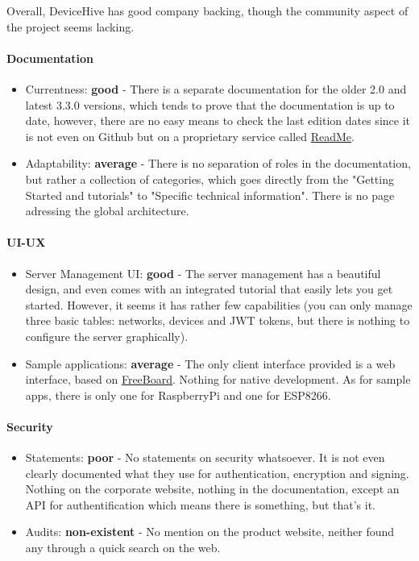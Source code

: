 \documentclass{article}
\begin{document}
Overall, DeviceHive has good company backing, though the community aspect of the project seems lacking.

\paragraph{Documentation}

\begin{itemize}
\item Currentness: \textbf{good} - There is a separate documentation for the older 2.0 and latest 3.3.0 versions, which tends to prove that the documentation is up to date, however, there are no easy means to check the last edition dates since it is not even on Github but on a proprietary service called \href{https://readme.io/}{ReadMe}.
\item Adaptability: \textbf{average} - There is no separation of roles in the documentation, but rather a collection of categories, which goes directly from the "Getting Started and tutorials" to "Specific technical information". There is no page adressing the global architecture.
\end{itemize}

\paragraph{UI-UX}

\begin{itemize}
\item Server Management UI: \textbf{good} - The server management has a beautiful design, and even comes with an integrated tutorial that easily lets you get started. However, it seems it has rather few capabilities (you can only manage three basic tables: networks, devices and JWT tokens, but there is nothing to configure the server graphically).
\item Sample applications: \textbf{average} - The only client interface provided is a web interface, based on \href{http://freeboard.io/}{FreeBoard}. Nothing for native development. As for sample apps, there is only one for RaspberryPi and one for ESP8266.
\end{itemize}

\paragraph{Security} 

\begin{itemize}
\item Statements: \textbf{poor} - No statements on security whatsoever. It is not even clearly documented what they use for authentication, encryption and signing. Nothing on the corporate website, nothing in the documentation, except an API for authentification which means there is something, but that's it.
\item Audits: \textbf{non-existent} - No mention on the product website, neither found any through a quick search on the web.
\end{itemize}
\end{document}
